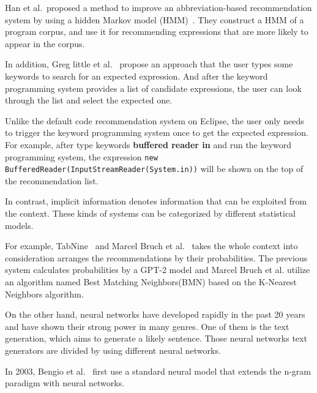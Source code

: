 \documentclass[PRO,english]{ipsj}
\begin{document}

Han et al.\ proposed a method to improve an abbreviation-based recommendation system by using a hidden Markov model (HMM)~\cite{Sangmok}.  They construct a HMM of a program corpus, and use it for recommending expressions that are more likely to appear in the corpus.



In addition, Greg little et al.~\cite{KeywordProgramming} propose an approach that the user types some keywords to search for an expected expression. And after the keyword programming system provides a list of candidate expressions, the user can look through the list and select the expected one. 

Unlike the default code recommendation system on Eclipse, the user only needs to trigger the keyword programming system once to get the expected expression. For example, after type keywords \textbf{buffered reader in} and run the keyword programming system, the expression \texttt{new BufferedReader(InputStreamReader(System.in))} will be shown on the top of the recommendation list.

In contrast, implicit information denotes information that can be exploited from the context. These kinds of systems can be categorized by different statistical models.

For example, TabNine~\cite{TabNine} and Marcel Bruch et al.~\cite{Marcel} takes the whole context into consideration arranges the recommendations by their probabilities. The previous system calculates probabilities by a GPT-2 model and Marcel Bruch et al. utilize an algorithm named Best Matching Neighbors(BMN) based on the K-Nearest Neighbors algorithm. 

On the other hand, neural networks have developed rapidly in the past 20 years and have shown their strong power in many genres. One of them is the text generation, which aims to generate a likely sentence. Those neural networks text generators are divided by using different neural networks.~\cite{NNTG}

In 2003, Bengio et al.~\cite{Bengio} first use a standard neural model that extends the n-gram paradigm with neural networks. 
\end{document}
